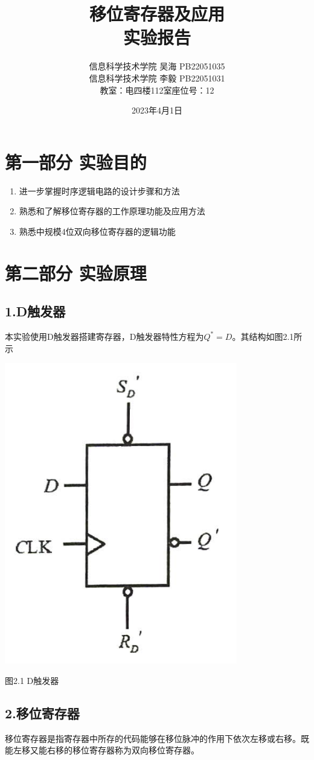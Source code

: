 \documentclass{ctexart}
\title{\Large 移位寄存器及应用\\{\large 实验报告}}
\author{\large  信息科学技术学院 \quad 吴海\MyFont{垚} PB22051035 \\\large  信息科学技术学院 \quad 李\quad 毅 PB22051031 \\{教室：电四楼112室\quad 座位号：12}}
\date{2023年4月1日}
\begin{document}
    \maketitle
    \thispagestyle{empty}
    
    \newpage 
    \setcounter{page}{1}

    \section*{第一部分 \quad 实验目的}

\begin{enumerate}
    \item 进一步掌握时序逻辑电路的设计步骤和方法
    \item 熟悉和了解移位寄存器的工作原理功能及应用方法
    \item 熟悉中规模4位双向移位寄存器的逻辑功能
\end{enumerate}

    \section*{第二部分 \quad 实验原理}
   \subsection*{1.D触发器}
   本实验使用D触发器搭建寄存器，D触发器特性方程为$Q^*=D$。其结构如图2.1所示

    \begin{minipage}[c]{0.9\textwidth}
        \centering
        \includegraphics[width=0.4\linewidth]{2.1.png} 

        图2.1 D触发器
    \end{minipage}

    \subsection*{2.移位寄存器}
    移位寄存器是指寄存器中所存的代码能够在移位脉冲的作用下依次左移或右移。既能左移又能右移的移位寄存器称为双向移位寄存器。
\end{document}

